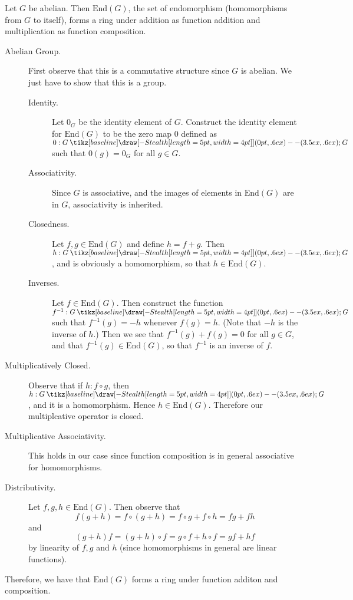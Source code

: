 \documentclass[12pt,letterpaper]{algebra_book}
\renewcommand{\to}{\mathbin{\tikz[baseline] \draw[-{Stealth[length=5pt,width=4pt]}] (0pt,.6ex) -- (3.5ex,.6ex);}}
\theoremstyle{definition}
\begin{document}
    \textcolor{Purple!80!White}{Let $G$ be abelian. Then $\mbox{End}(G)$, the set of
    endomorphism (homomorphisms from $G$ to itself), forms a
    ring under addition as function addition and multiplication as
    function composition.} 
    \begin{description}
        \item[Abelian Group.] First observe that this is a
        commutative structure since $G$ is abelian. We just have
        to show that this is a group.
        \begin{description}
            \item[Identity.] Let $0_G$ be the identity element of
            $G$. Construct the identity element for $\mbox{End}(G)$ to
            be the zero map $0$
            defined as $0: G \to G$ such that $0(g) = 0_G$ for all
            $g \in G$. 

            \item[Associativity.] Since $G$ is associative, and
            the images of elements in $\mbox{End}(G)$ are in $G$,
            associativity is inherited. 

            \item[Closedness.] Let $f, g \in \mbox{End}(G)$ and
            define $h = f + g$. Then $h: G \to G$, and is
            obviously a homomorphism, so that $h \in
            \mbox{End}(G)$. 

            \item[Inverses.] Let $f \in \mbox{End}(G)$. Then
            construct the function $f^{-1} : G 
            \to G$ such that $f^{-1}(g) = -h$ whenever $f(g) =
            h$. (Note that $-h$ is the inverse of $h$.) Then we
            see that $f^{-1}(g) + f(g) = 0$ for all $g \in G$, and
            that $f^{-1}(g) \in \mbox{End}(G)$, so that $f^{-1}$
            is an inverse of $f$. 
        \end{description}

        \item[Multiplicatively Closed.] Observe that if $h: f
        \circ g$, then $h: G \to G$, and it is a homomorphism.
        Hence $h \in \mbox{End}(G)$.
        Therefore our multiplcative operator is closed.

        \item[Multiplicative Associativity.] This holds in our
        case since function composition is in general associative
        for homomorphisms.

        \item[Distributivity.] Let $f, g, h \in \mbox{End}(G)$.
        Then observe that 
        \[
            f(g + h) = f \circ (g + h) = f \circ g + f \circ h = fg + fh
        \]
        and 
        \[
            (g + h)f = (g + h) \circ f = g \circ f + h \circ f = gf + hf
        \]
        by linearity of $f, g$ and $h$ (since homomorphisms in
        general are linear functions).
    \end{description}
    Therefore, we have that $\mbox{End}(G)$ forms a ring under
    function additon and composition.
    \\
\end{document}
